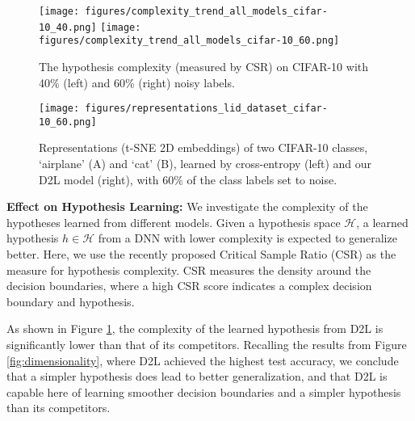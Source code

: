 \documentclass{article}
\begin{document}
\begin{figure}[!ht]
\centering
\small
\texttt{[image: figures/complexity\_trend\_all\_models\_cifar-10\_40.png]}
\texttt{[image: figures/complexity\_trend\_all\_models\_cifar-10\_60.png]}
\caption{The hypothesis complexity (measured by CSR) on CIFAR-10 with 40\% (left) and 60\% (right) noisy labels.}
\label{fig:complexity}
\end{figure}

\begin{figure}[!t]
\centering
\small
\texttt{[image: figures/representations\_lid\_dataset\_cifar-10\_60.png]}
\caption{Representations (t-SNE 2D embeddings) of two CIFAR-10 classes, `airplane' (A) and `cat' (B), learned by cross-entropy (left) and our D2L model (right), with 60\% of the class labels set to noise.}
\label{fig:representation}
\vspace{-0.2in}
\end{figure}

\textbf{Effect on Hypothesis Learning:}
\label{sec:complexity}
We investigate the complexity of the hypotheses learned from different models. Given a hypothesis space $\mathcal{H}$, a learned hypothesis $h \in \mathcal{H}$ from a DNN with lower complexity is expected to generalize better. 
Here, we use the recently proposed Critical Sample Ratio (CSR) \cite{arpit2017closer} as the measure for hypothesis complexity. CSR measures the density around the decision boundaries, where a high CSR score indicates a complex decision boundary and hypothesis.

As shown in Figure \ref{fig:complexity}, the complexity of the learned hypothesis from D2L is significantly lower than that of its competitors. Recalling the results from Figure \ref{fig:dimensionality}, where D2L achieved the highest test accuracy, we conclude that a simpler hypothesis does lead to better generalization, and that D2L is capable here of learning smoother decision boundaries and a simpler hypothesis than its competitors.
\end{document}
